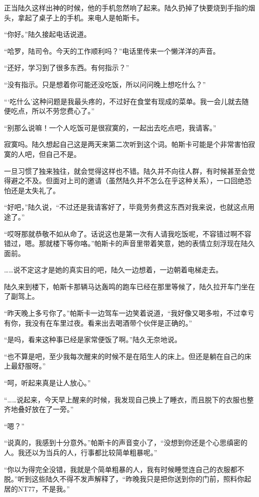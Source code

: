 正当陆久这样出神的时候，他的手机忽然响了起来。陆久扔掉了快要烧到手指的烟头，拿起了桌子上的手机。来电人是帕斯卡。

“你好。”陆久接起电话说道。

“哈罗，陆司令。今天的工作顺利吗？”电话里传来一个懒洋洋的声音。

“还好，学习到了很多东西。有何指示？”

“没有指示。只是想着你可能还没吃饭，所以问问晚上想吃什么？”

“‘吃什么’这种问题是我最头疼的，不过好在食堂有现成的菜单。我一会儿就去随便吃点，所以不劳您费心了。”

“别那么说嘛！一个人吃饭可是很寂寞的，一起出去吃点吧，我请客。”

寂寞吗。陆久想起自己这是两天来第二次听到这个词。帕斯卡可能是个非常害怕寂寞的人吧，但自己不是。

一旦习惯了独来独往，就会觉得这样也不错。陆久并不向往人群，有时候甚至会觉得避之不及。但面对上司的邀请（虽然陆久并不怎么在乎这种关系），一口回绝恐怕还是太失礼了。

“好吧，”陆久说，“不过还是我请客好了，毕竟劳务费这东西对我来说，也就这点用途了。”

“哎呀那就恭敬不如从命了。话说这也是第一次有人请我吃饭呢，不容错过啊不容错过，嗯。那就楼下等你咯。”帕斯卡的声音里带着笑意，她的表情立刻浮现在陆久面前。

……说不定这才是她的真实目的吧，陆久一边想着，一边朝着电梯走去。

陆久来到楼下，帕斯卡那辆马达轰鸣的跑车已经在那里等候了，陆久拉开车门坐在了副驾上。

“昨天晚上多亏你了。”帕斯卡一边驾车一边笑着说道，“我好像又喝多啦，不过幸亏有你，我没有在车里过夜。看来出去喝酒带个伙伴是正确的。”

“是吗，看来这种事已经是家常便饭了啊。”陆久无奈地说。

“也不算是吧，至少我每次醒来的时候不是在陌生人的床上。但还是躺在自己的床上最舒服呀。”

“呵，听起来真是让人放心。”

“……说起来，今天早上醒来的时候，我发现自己换上了睡衣，而且脱下的衣服也整齐地叠好放在了一旁。”

“嗯？”

“说真的，我感到十分意外。”帕斯卡的声音变小了，“没想到你还是个心思缜密的人。我还以为当兵的人，行事都比较简单粗暴呢。”

“你以为得完全没错，我就是个简单粗暴的人，我有时候睡觉连自己的衣服都不脱。”听到这些陆久不得不发声解释了，“昨晚我只是把你送到你的门前，照料你起居的NT77，不是我。”

